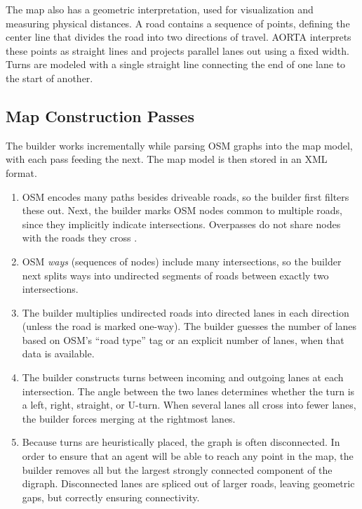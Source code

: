 \documentclass[letterpaper, 10 pt, conference]{ieeeconf}  %
\begin{document}
The map also has a geometric interpretation, used for visualization and
measuring physical distances. A road contains a sequence of points, defining
the center line that divides the road into two directions of travel. AORTA
interprets these points as straight lines and projects parallel lanes out using
a fixed width. Turns are modeled with a single straight line connecting the end
of one lane to the start of another.

\subsection{Map Construction Passes}
\label{sec:mapconstruction}

The builder works incrementally while parsing OSM graphs into the map model,
with each pass feeding the next. The map model is then stored in an XML format.
\begin{enumerate}
  \item OSM encodes many paths besides driveable roads, so the builder first filters
        these out. Next, the builder marks OSM nodes common to multiple roads, since
        they implicitly indicate intersections. Overpasses do not share nodes
        with the roads they cross \cite{osmOverpass}.
  \item OSM \emph{ways} (sequences of nodes) include many
        intersections, so the builder next splits ways into undirected
        segments of roads between exactly two intersections.
  \item The builder multiplies undirected roads into directed lanes in each
        direction (unless the road is marked one-way). The builder guesses the
        number of lanes based on OSM's ``road type'' tag or an explicit number of
        lanes, when that data is available.
  \item The builder constructs turns between incoming and outgoing lanes at each
        intersection. The angle between the two lanes determines whether the turn is
        a left, right, straight, or U-turn. When several lanes all cross into fewer
        lanes, the builder forces merging at the rightmost lanes. 
  \item Because turns are heuristically placed, the graph is often disconnected.
        In order to ensure that an agent will be able to reach any point in the map,
        the builder removes all but the largest strongly connected component of the
        digraph. Disconnected lanes are spliced out of larger roads, leaving
        geometric gaps, but correctly ensuring connectivity.
\end{enumerate}
\end{document}
